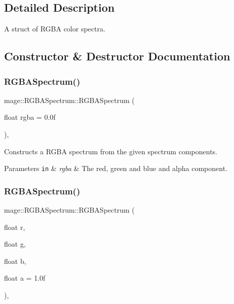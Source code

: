\subsection{Detailed Description}
A struct of R\+G\+BA color spectra. 

\subsection{Constructor \& Destructor Documentation}
\hypertarget{structmage_1_1_r_g_b_a_spectrum_ac19101586f3a587fe6cb2b26eade845d}{}\label{structmage_1_1_r_g_b_a_spectrum_ac19101586f3a587fe6cb2b26eade845d} 
\subsubsection{\texorpdfstring{R\+G\+B\+A\+Spectrum()}{RGBASpectrum()}\hspace{0.1cm}{\footnotesize\ttfamily [1/9]}}
{\footnotesize\ttfamily mage\+::\+R\+G\+B\+A\+Spectrum\+::\+R\+G\+B\+A\+Spectrum (\begin{DoxyParamCaption}\item[{float}]{rgba = {\ttfamily 0.0f} }\end{DoxyParamCaption})\hspace{0.3cm}{\ttfamily [explicit]}, {\ttfamily [noexcept]}}

Constructs a R\+G\+BA spectrum from the given spectrum components.


\begin{DoxyParams}[1]{Parameters}
\mbox{\tt in}  & {\em rgba} & The red, green and blue and alpha component. \\
\hline
\end{DoxyParams}
\hypertarget{structmage_1_1_r_g_b_a_spectrum_a0b1c8dcaacee8d6ba17f3cf0895a1595}{}\label{structmage_1_1_r_g_b_a_spectrum_a0b1c8dcaacee8d6ba17f3cf0895a1595} 
\subsubsection{\texorpdfstring{R\+G\+B\+A\+Spectrum()}{RGBASpectrum()}\hspace{0.1cm}{\footnotesize\ttfamily [2/9]}}
{\footnotesize\ttfamily mage\+::\+R\+G\+B\+A\+Spectrum\+::\+R\+G\+B\+A\+Spectrum (\begin{DoxyParamCaption}\item[{float}]{r,  }\item[{float}]{g,  }\item[{float}]{b,  }\item[{float}]{a = {\ttfamily 1.0f} }\end{DoxyParamCaption})\hspace{0.3cm}{\ttfamily [explicit]}, {\ttfamily [noexcept]}}


